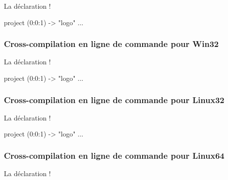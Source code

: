 La déclaration \ggsq!%
\begin{galgas4}
project (0:0:1) -> "logo" {
  ...
}
\end{galgas4}

\subsubsection{Cross-compilation en ligne de commande pour Win32}

La déclaration \ggsq!%

\begin{galgas4}
project (0:0:1) -> "logo" {
  ...
}
\end{galgas4}


\subsubsection{Cross-compilation en ligne de commande pour Linux32}

La déclaration \ggsq!%

\begin{galgas4}
project (0:0:1) -> "logo" {
  ...
}
\end{galgas4}


\subsubsection{Cross-compilation en ligne de commande pour Linux64}

La déclaration \ggsq!%

